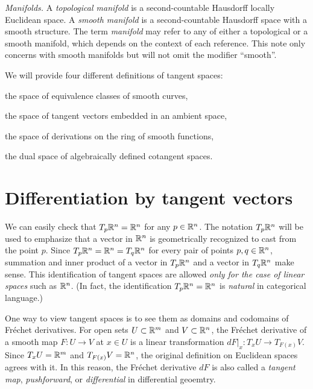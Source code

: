\documentclass{../note}
\begin{document}
\begin{prb}\emph{Manifolds.}
A \emph{topological manifold} is a second-countable Hausdorff locally Euclidean space.
A \emph{smooth manifold} is a second-countable Hausdorff space with a smooth structure.
The term \emph{manifold} may refer to any of either a topological or a smooth manifold, which depends on the context of each reference.
This note only concerns with smooth manifolds but will not omit the modifier ``smooth''.
\begin{parts}
\item
\end{parts}
\end{prb}





We will provide four different definitions of tangent spaces:
\begin{parts}
\item the space of equivalence classes of smooth curves,
\item the space of tangent vectors embedded in an ambient space,
\item the space of derivations on the ring of smooth functions,
\item the dual space of algebraically defined cotangent spaces.
\end{parts}







\newpage
\section*{Differentiation by tangent vectors}

\begin{rmk}
We can easily check that $T_p\mathbb{R}^n=\mathbb{R}^n$ for any $p\in\mathbb{R}^n$.
The notation $T_p\mathbb{R}^n$ will be used to emphasize that a vector in $\mathbb{R}^n$ is geometrically recognized to cast from the point $p$.
Since $T_p\mathbb{R}^n=\mathbb{R}^n=T_q\mathbb{R}^n$ for every pair of points $p,q\in\mathbb{R}^n$, summation and inner product of a vector in $T_p\mathbb{R}^n$ and a vector in $T_q\mathbb{R}^n$ make sense.
This identification of tangent spaces are allowed \emph{only for the case of linear spaces} such as $\mathbb{R}^n$.
(In fact, the identification $T_p\mathbb{R}^n=\mathbb{R}^n$ is \emph{natural} in categorical language.)
\end{rmk}
\begin{rmk}
One way to view tangent spaces is to see them as domains and codomains of Fr\'echet derivatives.
For open sets $U\subset\mathbb{R}^m$ and $V\subset\mathbb{R}^n$, the Fr\'echet derivative of a smooth map $F:U\to V$ at $x\in U$ is a linear transformation $dF|_x:T_xU\to T_{F(x)}V$.
Since $T_xU=\mathbb{R}^m$ and $T_{F(x)}V=\mathbb{R}^n$, the original definition on Euclidean spaces agrees with it.
In this reason, the Fr\'echet derivative $dF$ is also called a \emph{tangent map}, \emph{pushforward}, or \emph{differential} in differential geoemtry.
\end{rmk}
\end{document}
